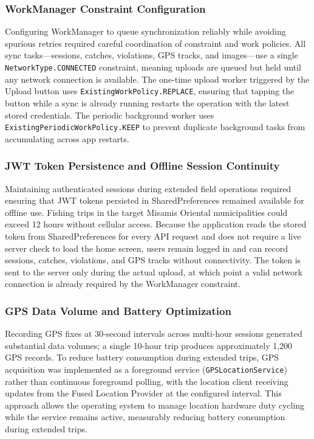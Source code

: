 \documentclass{icsthesis}
\begin{document}
\begin{mainmatter}
\subsubsection{WorkManager Constraint Configuration}

Configuring WorkManager to queue synchronization reliably while avoiding spurious retries
required careful coordination of constraint and work policies. All sync tasks---sessions,
catches, violations, GPS tracks, and images---use a single \texttt{NetworkType.CONNECTED}
constraint, meaning uploads are queued but held until any network connection is available.
The one-time upload worker triggered by the Upload button uses
\texttt{ExistingWorkPolicy.REPLACE}, ensuring that tapping the button while a sync is
already running restarts the operation with the latest stored credentials. The periodic
background worker uses \texttt{ExistingPeriodicWorkPolicy.KEEP} to prevent duplicate
background tasks from accumulating across app restarts.

\subsubsection{JWT Token Persistence and Offline Session Continuity}

Maintaining authenticated sessions during extended field operations required ensuring that
JWT tokens persisted in SharedPreferences remained available for offline use. Fishing
trips in the target Misamis Oriental municipalities could exceed 12 hours without cellular access. Because
the application reads the stored token from SharedPreferences for every API request and
does not require a live server check to load the home screen, users remain logged in and
can record sessions, catches, violations, and GPS tracks without connectivity. The token
is sent to the server only during the actual upload, at which point a valid network
connection is already required by the WorkManager constraint.

\subsubsection{GPS Data Volume and Battery Optimization}

Recording GPS fixes at 30-second intervals across multi-hour sessions generated
substantial data volumes; a single 10-hour trip produces approximately 1,200 GPS records.
To reduce battery consumption during extended trips, GPS acquisition was implemented as a
foreground service (\texttt{GPSLocationService}) rather than continuous foreground polling,
with the location client receiving updates from the Fused Location Provider at the
configured interval. This approach allows the operating system to manage location hardware
duty cycling while the service remains active, measurably reducing battery consumption
during extended trips.


\end{mainmatter}
\end{document}
